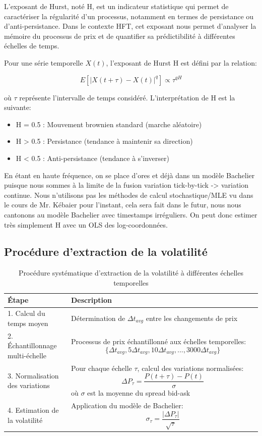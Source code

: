 \documentclass[10pt,a4paper]{article}
\theoremstyle{definition}
\theoremstyle{remark}
\begin{document}
L'exposant de Hurst, noté H, est un indicateur statistique qui permet de caractériser la régularité d'un processus, notamment en termes de persistance ou d'anti-persistance. Dans le contexte HFT, cet exposant nous permet d'analyser la mémoire du processus de prix et de quantifier sa prédictibilité à différentes échelles de temps.

Pour une série temporelle \(X(t)\), l'exposant de Hurst H est défini par la relation:

\[
E[|X(t+\tau) - X(t)|^q] \propto \tau^{qH}
\]

où \(\tau\) représente l'intervalle de temps considéré. L'interprétation de H est la suivante:
\begin{itemize}
    \item H = 0.5 : Mouvement brownien standard (marche aléatoire)
    \item H > 0.5 : Persistance (tendance à maintenir sa direction)
    \item H < 0.5 : Anti-persistance (tendance à s'inverser)
\end{itemize}

En étant en haute fréquence, on se place d'ores et déjà dans un modèle Bachelier puisque nous sommes à la limite de la fusion variation tick-by-tick -> variation continue.
Nous n'utilisons pas les méthodes de calcul stochastique/MLE vu dans le cours de Mr. Kébaier pour l'instant, cela sera fait dans le futur, nous nous cantonons au modèle Bachelier avec timestamps irréguliers.
On peut donc estimer très simplement H avec un OLS des log-coordonnées.

\subsection{Procédure d'extraction de la volatilité}

\begin{landscape}
\begin{table}[h!]
\centering
\begin{tabular}{|p{0.25\linewidth}|p{0.75\linewidth}|}
\hline
\textbf{Étape} & \textbf{Description} \\
\hline
1. Calcul du temps moyen & Détermination de \(\Delta t_{avg}\) entre les changements de prix \\
\hline
2. Échantillonnage multi-échelle & Processus de prix échantillonné aux échelles temporelles: \[\{\Delta t_{avg}, 5\Delta t_{avg}, 10\Delta t_{avg}, ..., 3000\Delta t_{avg}\}\] \\
\hline
3. Normalisation des variations & Pour chaque échelle \(\tau\), calcul des variations normalisées: \[\Delta P_{\tau} = \frac{P(t+\tau) - P(t)}{\sigma}\] où \(\sigma\) est la moyenne du spread bid-ask \\
\hline
4. Estimation de la volatilité & Application du modèle de Bachelier: \[\sigma_{\tau} = \frac{|\Delta P_{\tau}|}{\sqrt{\tau}}\] \\
\hline
\end{tabular}
\caption{Procédure systématique d'extraction de la volatilité à différentes échelles temporelles}
\label{tab:volatility_extraction}
\end{table}
\end{landscape}
\end{document}
